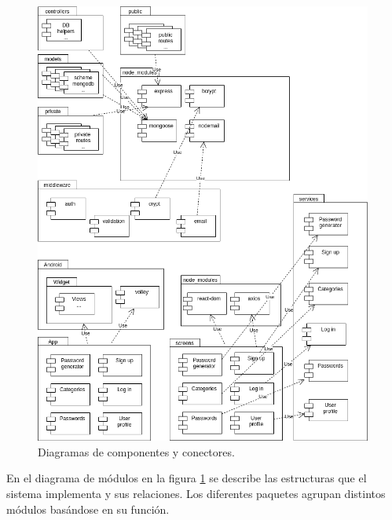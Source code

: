 \documentclass{article}
\begin{document}
\begin{figure}[H]
    \centering
        \includegraphics[width=0.99\textwidth]{../images/modulos_v1.png}
    \caption{Diagramas de componentes y conectores.}
    \label{modulos}
\end{figure}
\pagebreak

En el diagrama de módulos en la figura \ref{modulos} se describe las estructuras que el sistema implementa y sus relaciones. Los diferentes paquetes agrupan distintos módulos basándose en su función.
\end{document}
